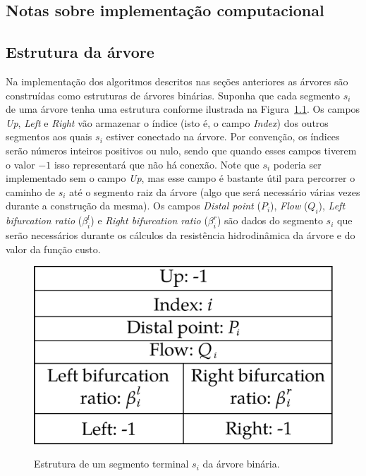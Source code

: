 \begin{apendices}
  \chapter{\apendseq Notas sobre implementação computacional}\label{apd:notas-sobre-implementacao}

  \section{Estrutura da árvore}\label{sec:estrutura-da-arvore}

Na implementação dos algoritmos descritos nas seções anteriores as árvores são construídas como
estruturas de árvores binárias. Suponha que cada segmento $s_i$ de uma árvore tenha uma 
estrutura conforme ilustrada na Figura~\ref{fig:estrutura-do-segmento}.
Os campos \textit{Up}, \textit{Left} e \textit{Right} vão 
armazenar o índice (isto é, o campo \textit{Index}) dos outros segmentos aos quais $s_i$ estiver conectado 
na árvore. Por convenção, os índices serão números inteiros positivos ou nulo, sendo que quando esses campos 
tiverem o valor $-1$ isso representará que não há conexão. 
Note que $s_i$ poderia 
ser implementado sem o campo \textit{Up}, 
mas esse campo é bastante útil para percorrer o caminho de $s_i$ até o segmento 
raiz da árvore (algo que será necessário várias vezes durante a construção da mesma).
Os campos \textit{Distal point} ($P_i$), \textit{Flow} ($Q_i$), 
\textit{Left bifurcation ratio} ($\beta_i^l$) e \textit{Right bifurcation ratio} ($\beta_i^r$)
são dados do segmento $s_i$ que serão necessários durante os cálculos da 
resistência hidrodinâmica da árvore e do valor da função custo.

\begin{figure}[!htb]
  \centering
  \captiondelim{: }
  \caption{Estrutura de um segmento terminal $s_i$ da árvore binária.}  
  \includegraphics[scale=0.35]{figuras/notas-sobre-implementacao/estrutura-do-segmento.pdf}
  \label{fig:estrutura-do-segmento}
\end{figure}


\end{apendices}
